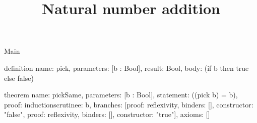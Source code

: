 \begin{lexlean}{Main}
\title{Natural number addition}
\begin{semanticmodule}
definition{
  name: pick,
  parameters: [b : Bool],
  result: Bool,
  body: (if b then true else false)
}

theorem{
  name: pickSame,
  parameters: [b : Bool],
  statement: ((pick b) = b),
  proof: induction{scrutinee: b, branches: [{proof: reflexivity{}, binders: [], constructor: "false"}, {proof: reflexivity{}, binders: [], constructor: "true"}]},
  axioms: []
}
\end{semanticmodule}
\end{lexlean}
